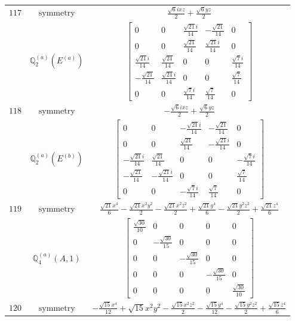 \documentclass[fleqn,8pt,landscape]{jsarticle}
\begin{document}
\begin{longtable}{ccc}
$ 117 $ & $ \text{symmetry} $ & $ \frac{\sqrt{6} i x z}{2} + \frac{\sqrt{6} y z}{2} $ \\
$  $ & $ \mathbb{Q}_{2}^{(a)}(E^{(a)}) $ & $ \begin{bmatrix} 0 & 0 & \frac{\sqrt{21} i}{14} & - \frac{\sqrt{21}}{14} & 0 \\ 0 & 0 & \frac{\sqrt{21}}{14} & \frac{\sqrt{21} i}{14} & 0 \\ \frac{\sqrt{21} i}{14} & \frac{\sqrt{21}}{14} & 0 & 0 & \frac{\sqrt{7} i}{14} \\ - \frac{\sqrt{21}}{14} & \frac{\sqrt{21} i}{14} & 0 & 0 & \frac{\sqrt{7}}{14} \\ 0 & 0 & \frac{\sqrt{7} i}{14} & \frac{\sqrt{7}}{14} & 0 \end{bmatrix} $ \\ \hline
$ 118 $ & $ \text{symmetry} $ & $ - \frac{\sqrt{6} i x z}{2} + \frac{\sqrt{6} y z}{2} $ \\
$  $ & $ \mathbb{Q}_{2}^{(a)}(E^{(b)}) $ & $ \begin{bmatrix} 0 & 0 & - \frac{\sqrt{21} i}{14} & - \frac{\sqrt{21}}{14} & 0 \\ 0 & 0 & \frac{\sqrt{21}}{14} & - \frac{\sqrt{21} i}{14} & 0 \\ - \frac{\sqrt{21} i}{14} & \frac{\sqrt{21}}{14} & 0 & 0 & - \frac{\sqrt{7} i}{14} \\ - \frac{\sqrt{21}}{14} & - \frac{\sqrt{21} i}{14} & 0 & 0 & \frac{\sqrt{7}}{14} \\ 0 & 0 & - \frac{\sqrt{7} i}{14} & \frac{\sqrt{7}}{14} & 0 \end{bmatrix} $ \\ \hline
$ 119 $ & $ \text{symmetry} $ & $ \frac{\sqrt{21} x^{4}}{6} - \frac{\sqrt{21} x^{2} y^{2}}{2} - \frac{\sqrt{21} x^{2} z^{2}}{2} + \frac{\sqrt{21} y^{4}}{6} - \frac{\sqrt{21} y^{2} z^{2}}{2} + \frac{\sqrt{21} z^{4}}{6} $ \\
$  $ & $ \mathbb{Q}_{4}^{(a)}(A,1) $ & $ \begin{bmatrix} \frac{\sqrt{30}}{10} & 0 & 0 & 0 & 0 \\ 0 & - \frac{\sqrt{30}}{15} & 0 & 0 & 0 \\ 0 & 0 & - \frac{\sqrt{30}}{15} & 0 & 0 \\ 0 & 0 & 0 & - \frac{\sqrt{30}}{15} & 0 \\ 0 & 0 & 0 & 0 & \frac{\sqrt{30}}{10} \end{bmatrix} $ \\ \hline
$ 120 $ & $ \text{symmetry} $ & $ - \frac{\sqrt{15} x^{4}}{12} + \sqrt{15} x^{2} y^{2} - \frac{\sqrt{15} x^{2} z^{2}}{2} - \frac{\sqrt{15} y^{4}}{12} - \frac{\sqrt{15} y^{2} z^{2}}{2} + \frac{\sqrt{15} z^{4}}{6} $ \\

\end{longtable}
\end{document}
